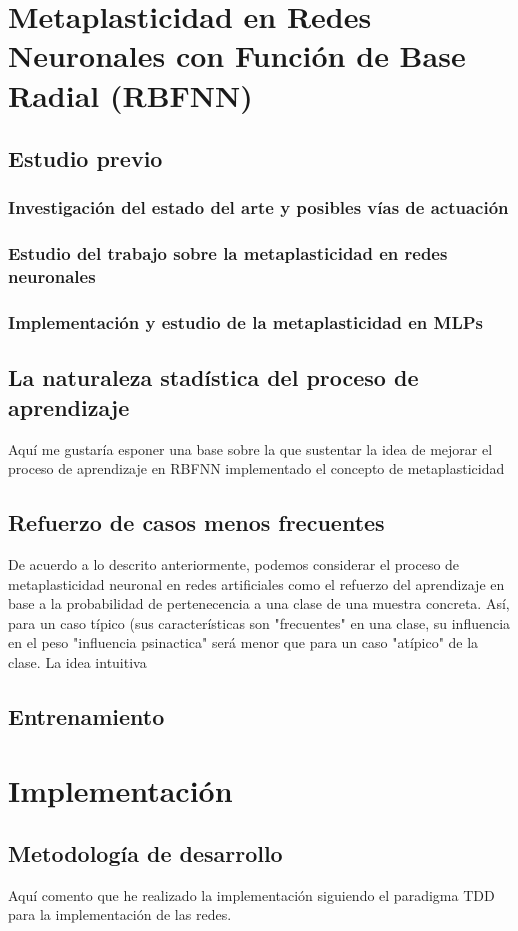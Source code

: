 \documentclass[10pt,a4paper, twocolumn]{report}
\begin{document}
\chapter{Metaplasticidad en Redes Neuronales con Función de Base Radial (RBFNN)}
\section{Estudio previo}
\subsection{Investigación del estado del arte y posibles vías de actuación}
\subsection{Estudio del trabajo sobre la metaplasticidad en redes neuronales}
\subsection{Implementación y estudio de la metaplasticidad en MLPs}
\section{La naturaleza stadística del proceso de aprendizaje}
Aquí me gustaría esponer una base sobre la que sustentar la idea de mejorar el proceso de aprendizaje en RBFNN implementado el concepto de metaplasticidad
\section{Refuerzo de casos menos frecuentes}
De acuerdo a lo descrito anteriormente, podemos considerar el proceso de metaplasticidad neuronal en redes artificiales como el refuerzo del aprendizaje en base a la probabilidad de pertenecencia a una clase de una muestra concreta. Así, para un caso típico (sus características son "frecuentes" en una clase, su influencia en el peso "influencia psinactica" será menor que para un caso "atípico" de la clase.
La idea intuitiva   
\section{Entrenamiento}
\chapter{Implementación}
\section{Metodología de desarrollo}
Aquí comento que he realizado la implementación siguiendo el paradigma TDD para la implementación de las redes.
\end{document}

